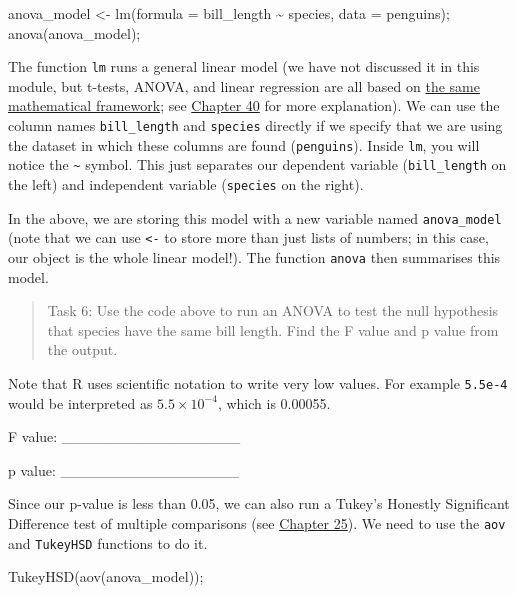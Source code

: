 \documentclass[
]{scrbook}
\newenvironment{Shaded}{\begin{snugshade}}{\end{snugshade}}
\newcommand{\AttributeTok}[1]{\textcolor[rgb]{0.77,0.63,0.00}{#1}}
\newcommand{\FunctionTok}[1]{\textcolor[rgb]{0.00,0.00,0.00}{#1}}
\newcommand{\NormalTok}[1]{#1}
\newcommand{\OtherTok}[1]{\textcolor[rgb]{0.56,0.35,0.01}{#1}}
\newcommand{\SpecialCharTok}[1]{\textcolor[rgb]{0.00,0.00,0.00}{#1}}
\begin{document}
\begin{Shaded}
\begin{Highlighting}[]
\NormalTok{anova\_model }\OtherTok{\textless{}{-}} \FunctionTok{lm}\NormalTok{(}\AttributeTok{formula =}\NormalTok{ bill\_length }\SpecialCharTok{\textasciitilde{}}\NormalTok{ species, }\AttributeTok{data =}\NormalTok{ penguins);}
\FunctionTok{anova}\NormalTok{(anova\_model);}
\end{Highlighting}
\end{Shaded}

The function \texttt{lm} runs a general linear model (we have not discussed it in this module, but t-tests, ANOVA, and linear regression are all based on \href{https://stirlingcodingclub.github.io/linear_modelling/}{the same mathematical framework}; see \protect\hyperlink{Chapter_40}{Chapter 40} for more explanation).
We can use the column names \texttt{bill\_length} and \texttt{species} directly if we specify that we are using the dataset in which these columns are found (\texttt{penguins}).
Inside \texttt{lm}, you will notice the \texttt{\textasciitilde{}} symbol. This just separates our dependent variable (\texttt{bill\_length} on the left) and independent variable (\texttt{species} on the right).

In the above, we are storing this model with a new variable named \texttt{anova\_model} (note that we can use \texttt{\textless{}-} to store more than just lists of numbers; in this case, our object is the whole linear model!).
The function \texttt{anova} then summarises this model.

\begin{quote}
Task 6: Use the code above to run an ANOVA to test the null hypothesis that species have the same bill length. Find the F value and p value from the output.
\end{quote}

Note that R uses scientific notation to write very low values. For example \texttt{5.5e-4} would be interpreted as \(5.5 \times 10^{-4}\), which is 0.00055.

F value: \_\_\_\_\_\_\_\_\_\_\_\_\_\_\_\_\_

p value: \_\_\_\_\_\_\_\_\_\_\_\_\_\_\_\_\_

Since our p-value is less than 0.05, we can also run a Tukey's Honestly Significant Difference test of multiple comparisons (see \protect\hyperlink{Chapter_25}{Chapter 25}).
We need to use the \texttt{aov} and \texttt{TukeyHSD} functions to do it.

\begin{Shaded}
\begin{Highlighting}[]
\FunctionTok{TukeyHSD}\NormalTok{(}\FunctionTok{aov}\NormalTok{(anova\_model));}
\end{Highlighting}
\end{Shaded}
\end{document}
